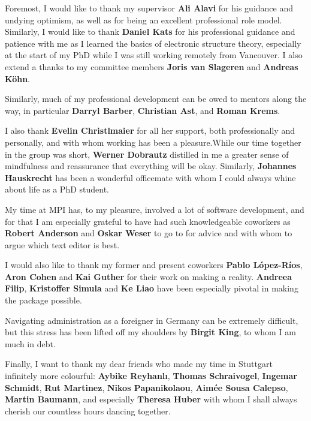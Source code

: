 
Foremost, I would like to thank my supervisor \textbf{Ali Alavi} for his guidance and undying optimism, as well as for being an excellent professional role model. Similarly, I would like to thank \textbf{Daniel Kats} for his professional guidance and patience with me as I learned the basics of electronic structure theory, especially at the start of my PhD while I was still working remotely from Vancouver. I also extend a thanks to my committee members \textbf{Joris van Slageren} and \textbf{Andreas K\"ohn}.

Similarly, much of my professional development can be owed to mentors along the way, in particular \textbf{Darryl Barber}, \textbf{Christian Ast}, and \textbf{Roman Krems}.

I also thank \textbf{Evelin Christlmaier} for all her support, both professionally and personally, and with whom working has been a pleasure.While our time together in the group was short, \textbf{Werner Dobrautz} distilled in me a greater sense of mindfulness and reassurance that everything will be okay. Similarly, \textbf{Johannes Hauskrecht} has been a wonderful officemate with whom I could always whine about life as a PhD student.

My time at MPI has, to my pleasure, involved a lot of software development, and for that I am especially grateful to have had such knowledgeable coworkers as \textbf{Robert Anderson} and \textbf{Oskar Weser} to go to for advice and with whom to argue which text editor is best.

I would also like to thank my former and present coworkers \textbf{Pablo L\'opez-R\'ios}, \textbf{Aron Cohen} and \textbf{Kai Guther} for their work on making \tchint a reality. \textbf{Andreea Filip}, \textbf{Kristoffer Simula} and \textbf{Ke Liao} have been especially pivotal in making the \pytchint package possible.


Navigating administration as a foreigner in Germany can be extremely difficult, but this stress has been lifted off my shoulders by \textbf{Birgit King}, to whom I am much in debt.


Finally, I want to thank my dear friends who made my time in Stuttgart infinitely more colourful: \textbf{Aybike Reyhanl\i}, \textbf{Thomas Schraivogel}, \textbf{Ingemar Schmidt}, \textbf{Rut Martinez}, \textbf{Nikos Papanikolaou}, \textbf{Aim\'ee Sousa Calepso}, \textbf{Martin Baumann}, and especially \textbf{Theresa Huber} with whom I shall always cherish our countless hours dancing together.
